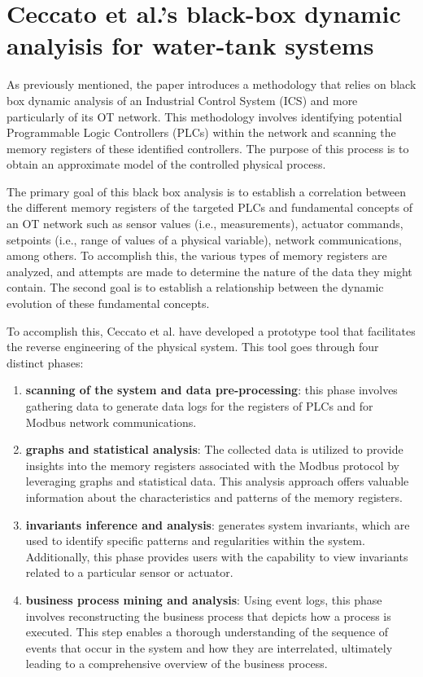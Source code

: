 \section{Ceccato et al.’s black-box dynamic analyisis for water-tank systems}
\label{sec:3_ceccato_metodology}
As previously mentioned, the paper introduces a methodology that relies on black box dynamic analysis of an Industrial Control System (ICS) and more particularly of its OT network. This methodology involves identifying potential Programmable Logic Controllers (PLCs) within the network and scanning the memory registers of these identified controllers. The purpose of this process is to obtain an approximate model of the controlled physical process.

\bigskip
The primary goal of this black box analysis is to establish a correlation between the different memory registers of the targeted PLCs and fundamental concepts of an OT network such as sensor values (i.e., measurements), actuator commands, setpoints (i.e., range of values of a physical variable), network communications, among others.\newline 
To accomplish this, the various types of memory registers are analyzed, and attempts are made to determine the nature of the data they might contain.\newline
The second goal is to establish a relationship between the dynamic evolution of these fundamental concepts.

\bigskip
To accomplish this, Ceccato et al. have developed a prototype tool \cite{plc_re} that facilitates the reverse engineering of the physical system. This tool goes through four distinct phases:

\begin{enumerate}
	\item \textbf{scanning of the system and data pre-processing}: this phase involves gathering data to generate data logs for the registers of PLCs and for Modbus network communications.
	
	\item \textbf{graphs and statistical analysis}: The collected data is utilized to provide insights into the memory registers associated with the Modbus protocol by leveraging graphs and statistical data. This analysis approach offers valuable information about the characteristics and patterns of the memory registers.
	
	\item \textbf{invariants inference and analysis}: generates system invariants, which are used to identify specific patterns and regularities within the system. Additionally, this phase provides users with the capability to view invariants related to a particular sensor or actuator.
	
	\item \textbf{business process mining and analysis}: Using event logs, this phase involves reconstructing the business process that depicts how a process is executed. This step enables a thorough understanding of the sequence of events that occur in the system and how they are interrelated, ultimately leading to a comprehensive overview of the business process.
\end{enumerate}


